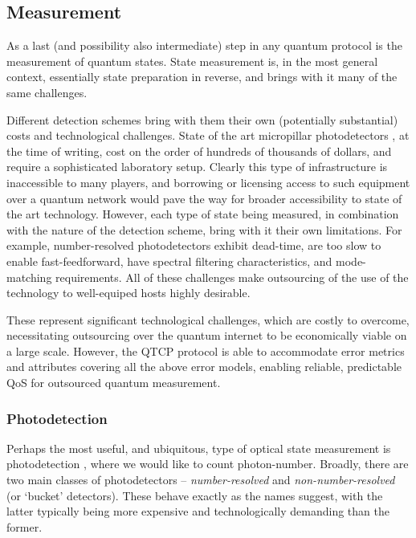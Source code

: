 \documentclass[aps,rmp,twocolumn,amsmath,amssymb,nofootinbib,superscriptaddress,longbibliography,floatfix]{revtex4-1}
\begin{document}
\subsection{Measurement}

As a last (and possibility also intermediate) step in any quantum protocol is the measurement of quantum states. State measurement is, in the most general context, essentially state preparation in reverse, and brings with it many of the same challenges.

Different detection schemes bring with them their own (potentially substantial) costs and technological challenges. State of the art micropillar photodetectors \cite{???}, at the time of writing, cost on the order of hundreds of thousands of dollars, and require a sophisticated laboratory setup. Clearly this type of infrastructure is inaccessible to many players, and borrowing or licensing access to such equipment over a quantum network would pave the way for broader accessibility to state of the art technology. However, each type of state being measured, in combination with the nature of the detection scheme, bring with it their own limitations. For example, number-resolved photodetectors exhibit dead-time, are too slow to enable fast-feedforward, have spectral filtering characteristics, and mode-matching requirements. All of these challenges make outsourcing of the use of the technology to well-equiped hosts highly desirable.

These represent significant technological challenges, which are costly to overcome, necessitating outsourcing over the quantum internet to be economically viable on a large scale. However, the QTCP protocol is able to accommodate error metrics and attributes covering all the above error models, enabling reliable, predictable QoS for outsourced quantum measurement.

%
%

\subsubsection{Photodetection}

Perhaps the most useful, and ubiquitous, type of optical state measurement is photodetection \cite{RohdePDReview}, where we would like to count photon-number. Broadly, there are two main classes of photodetectors -- \emph{number-resolved} and \emph{non-number-resolved} (or `bucket' detectors). These behave exactly as the names suggest, with the latter typically being more expensive and technologically demanding than the former.
\end{document}
